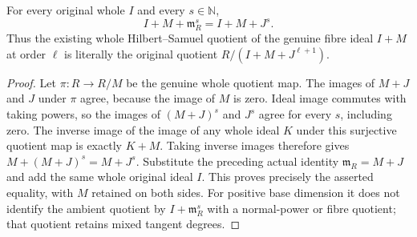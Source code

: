 \begin{lemma}
\label{hir:relative-normal-original-fibre-maximal-power}
\leanok
{}
For every original whole $I$ and every $s\in\mathbb N$,
\[
 I+M+\mathfrak m_R^s=I+M+J^s.
\]
Thus the existing whole Hilbert--Samuel quotient of the genuine fibre
ideal $I+M$ at order $\ell$ is literally the original quotient
$R/(I+M+J^{\ell+1})$.
\end{lemma}
\begin{proof}
Let $\pi:R\to R/M$ be the genuine whole quotient map. The images
of $M+J$ and $J$ under $\pi$ agree, because the image of $M$ is zero.
Ideal image commutes with taking powers, so the images of $(M+J)^s$
and $J^s$ agree for every $s$, including zero. The inverse image of
the image of any whole ideal $K$ under this surjective quotient map is
exactly $K+M$. Taking inverse images therefore gives
$M+(M+J)^s=M+J^s$. Substitute the preceding actual identity
$\mathfrak m_R=M+J$ and add the same whole original ideal $I$.
This proves precisely the asserted equality, with $M$ retained on both
sides. For positive base dimension it does not identify the ambient
quotient by $I+\mathfrak m_R^s$ with a normal-power or fibre quotient;
that quotient retains mixed tangent degrees.
\end{proof}

